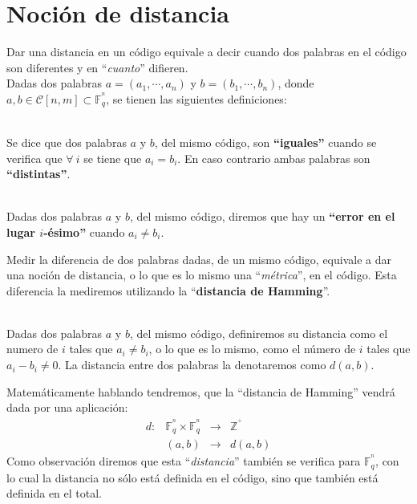 %
%

\section{Noci\'on de distancia}

Dar una distancia en un c\'odigo equivale a decir cuando dos palabras en el
c\'odigo son diferentes y en ``\emph{cuanto}'' difieren.\\

Dadas dos palabras $a=(a_1,\cdots,a_n)$ y $b=(b_1,\cdots,b_n)$, donde $a,b
\in \mathcal{C}[n,m]\subset \mathbb{F}^{^n}_q$, se tienen las siguientes
definiciones:
\begin{definicion}
\ \\
Se dice que dos palabras $a$ y $b$, del mismo c\'odigo, son \textbf{``iguales''}
cuando se verifica que $\forall \ i$ se tiene que $a_i=b_i$. En caso contrario
ambas palabras son \textbf{``distintas''}.
\end{definicion}

\begin{definicion}
\ \\
Dadas dos palabras $a$ y $b$, del mismo c\'odigo, diremos que hay un
\textbf{``error en el lugar $i$-\'esimo''} cuando $a_i\neq b_i$.
\end{definicion}
Medir la diferencia de dos palabras dadas, de un mismo c\'odigo, equivale a
dar una noci\'on de distancia, o lo que es lo mismo una ``\emph{m\'etrica}'',
en el c\'odigo. Esta diferencia la mediremos utilizando la ``\textbf{distancia
de Hamming}''.
\begin{definicion}
\ \\
Dadas dos palabras $a$ y $b$, del mismo c\'odigo, definiremos su distancia como
el numero de $i$ tales que $a_i\neq b_i$, o lo que es lo mismo, como el n\'umero
de $i$ tales que $a_i-b_i \neq 0$. La distancia entre dos palabras la
denotaremos como $d(a,b)$.
\end{definicion}
Matem\'aticamente hablando tendremos, que la ``distancia de Hamming'' vendr\'a
dada por una aplicaci\'on:
\begin{displaymath}
\begin{array}{cccc}
d:&\mathbb{F}^{^n}_q\times \mathbb{F}^{^n}_q&\longrightarrow & \mathbb{Z}^{^+}\\
&(a,b)&\longrightarrow & d(a,b)
\end{array}
\end{displaymath}
Como observaci\'on diremos que esta ``\emph{distancia}'' tambi\'en se verifica
para $\mathbb{F}^{^n}_q$, con lo cual la distancia no s\'olo est\'a definida
en el c\'odigo, sino que tambi\'en est\'a definida en el total.


